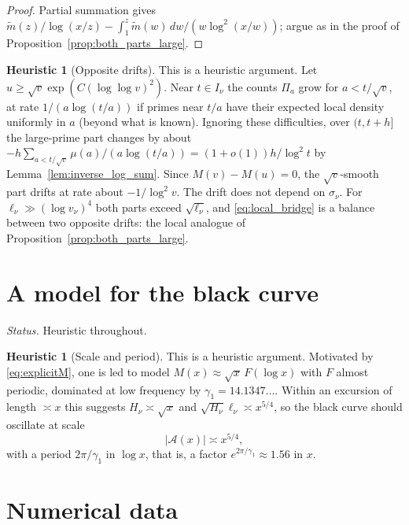 \documentclass[11pt]{amsart}
\numberwithin{equation}{section}
\theoremstyle{plain}
\theoremstyle{definition}
\newtheorem{heuristic}[theorem]{Heuristic}
\theoremstyle{remark}
\newcommand{\Anet}{\mathcal{A}}
\newcommand{\mt}{\widetilde{m}}
\begin{document}
\begin{proof}
Partial summation gives
$\mt(z)/\log(x/z)-\int_1^z\mt(w)\,dw/(w\log^2(x/w))$; argue as in the proof
of Proposition~\ref{prop:both_parts_large}.
\end{proof}

\begin{heuristic}[Opposite drifts]
\label{heu:local_drift}
This is a heuristic argument. Let $u\ge\sqrt v\exp(C(\log\log v)^2)$. Near
$t\in I_\nu$ the counts $\Pi_a$ grow for $a<t/\sqrt v$, at rate
$1/(a\log(t/a))$ if primes near $t/a$ have their expected local density
uniformly in $a$ (beyond what is known). Ignoring these difficulties, over
$(t,t+h]$ the large-prime part changes by about
$-h\sum_{a<t/\sqrt v}\mu(a)/(a\log(t/a))=(1+o(1))h/\log^2t$ by
Lemma~\ref{lem:inverse_log_sum}. Since $M(v)-M(u)=0$, the
$\sqrt v$-smooth part drifts at rate about $-1/\log^2v$. The drift does not
depend on $\sigma_\nu$. For $\ell_\nu\gg(\log v_\nu)^4$ both parts exceed
$\sqrt{\ell_\nu}$, and \eqref{eq:local_bridge} is a balance between two
opposite drifts: the local analogue of
Proposition~\ref{prop:both_parts_large}.
\end{heuristic}

\section{A model for the black curve}
\label{sec:model}

\noindent\emph{Status.} Heuristic throughout.

\begin{heuristic}[Scale and period]
\label{heu:model}
This is a heuristic argument. Motivated by \eqref{eq:explicitM}, one is led
to model $M(x)\approx\sqrt x\,F(\log x)$ with $F$ almost periodic, dominated
at low frequency by $\gamma_1=14.1347\ldots$. Within an excursion of length
$\asymp x$ this suggests $H_\nu\asymp\sqrt x$ and
$\sqrt{H_\nu}\ell_\nu\asymp x^{5/4}$, so the black curve should oscillate at
scale
\begin{equation}
\label{eq:model_scale}
  |\Anet(x)|\asymp x^{5/4},
\end{equation}
with a period $2\pi/\gamma_1$ in $\log x$, that is, a factor
$e^{2\pi/\gamma_1}\approx1.56$ in $x$.
\end{heuristic}

\section{Numerical data}
\label{sec:data}
\end{document}
